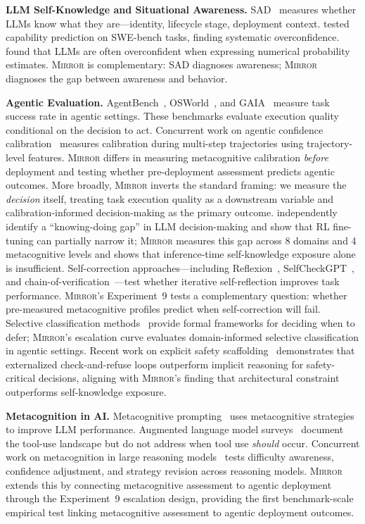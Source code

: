 \documentclass[10pt]{article}
\newcommand{\mirror}{\textsc{Mirror}}
\begin{document}
\textbf{LLM Self-Knowledge and Situational Awareness.}
SAD~\citep{laine2024me} measures whether LLMs know what they are---identity,
lifecycle stage, deployment context. \citet{barkan2025llms} tested capability
prediction on SWE-bench tasks, finding systematic overconfidence.
\citet{xiong2023can} found that LLMs are often overconfident when expressing
numerical probability estimates. \mirror{} is complementary: SAD diagnoses
awareness; \mirror{} diagnoses the gap between awareness and behavior.

\textbf{Agentic Evaluation.}
AgentBench~\citep{liu2023agentbench}, OSWorld~\citep{xie2024osworld}, and
GAIA~\citep{mialon2023gaia} measure task success rate in agentic settings. These
benchmarks evaluate execution quality conditional on the decision to act.
Concurrent work on agentic confidence calibration~\citep{htc2026} measures
calibration during multi-step trajectories using trajectory-level features.
\mirror{} differs in measuring metacognitive calibration \textit{before} deployment
and testing whether pre-deployment assessment predicts agentic outcomes. More
broadly, \mirror{} inverts the standard framing: we measure the \textit{decision}
itself, treating task execution quality as a downstream variable and
calibration-informed decision-making as the primary outcome.
\citet{schmied2026greedy} independently identify a ``knowing-doing gap'' in LLM
decision-making and show that RL fine-tuning can partially narrow it; \mirror{}
measures this gap across 8 domains and 4 metacognitive levels and shows that
inference-time self-knowledge exposure alone is insufficient.
Self-correction approaches---including Reflexion~\citep{shinn2023reflexion},
SelfCheckGPT~\citep{manakul2023selfcheckgpt}, and
chain-of-verification~\citep{dhuliawala2023chainofverification}---test whether
iterative self-reflection improves task performance. \mirror{}'s Experiment~9
tests a complementary question: whether pre-measured metacognitive profiles predict
when self-correction will fail. Selective classification
methods~\citep{geifman2017selective} provide formal frameworks for deciding when
to defer; \mirror{}'s escalation curve evaluates domain-informed selective
classification in agentic settings.
Recent work on explicit safety scaffolding~\citep{mosaic2026} demonstrates that
externalized check-and-refuse loops outperform implicit reasoning for
safety-critical decisions, aligning with \mirror{}'s finding that architectural
constraint outperforms self-knowledge exposure.

\textbf{Metacognition in AI.}
Metacognitive prompting~\citep{wang2024metacognitive} uses metacognitive strategies
to improve LLM performance. Augmented language model surveys~\citep{mialon2023augmented}
document the tool-use landscape but do not address when tool use \textit{should}
occur. Concurrent work on metacognition in large reasoning
models~\citep{metacog2026} tests difficulty awareness, confidence adjustment, and
strategy revision across reasoning models. \mirror{} extends this by connecting
metacognitive assessment to agentic deployment through the Experiment~9 escalation
design, providing the first benchmark-scale empirical test linking metacognitive
assessment to agentic deployment outcomes.
\end{document}
